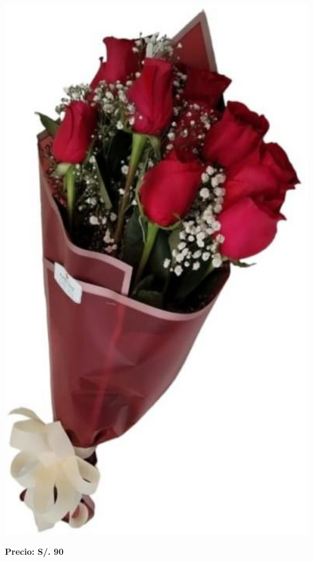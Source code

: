 \documentclass{article}
\begin{document}
\begin{minipage}{0.35\textwidth}
    \includegraphics[width=1.0\textwidth]{imagenes_extraidas/image_6_1}
\end{minipage}
\vspace{0.3cm}
\begin{center}
   \textbf{\Large Precio: \textcolor{cpred}{S/. 90 }}
\end{center}
\vspace{1cm}
\noindent
\end{document}
